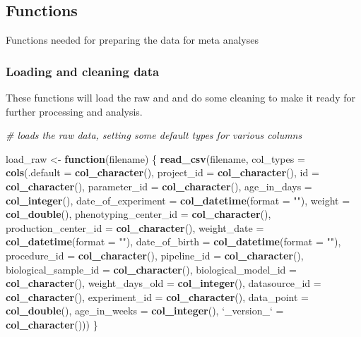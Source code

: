 \documentclass[]{article}
\newenvironment{Shaded}{\begin{snugshade}}{\end{snugshade}}
\newcommand{\CommentTok}[1]{\textcolor[rgb]{0.56,0.35,0.01}{\textit{#1}}}
\newcommand{\ControlFlowTok}[1]{\textcolor[rgb]{0.13,0.29,0.53}{\textbf{#1}}}
\newcommand{\DataTypeTok}[1]{\textcolor[rgb]{0.13,0.29,0.53}{#1}}
\newcommand{\KeywordTok}[1]{\textcolor[rgb]{0.13,0.29,0.53}{\textbf{#1}}}
\newcommand{\NormalTok}[1]{#1}
\newcommand{\StringTok}[1]{\textcolor[rgb]{0.31,0.60,0.02}{#1}}
\begin{document}
\hypertarget{functions}{%
\subsection{Functions}\label{functions}}

Functions needed for preparing the data for meta analyses

\hypertarget{loading-and-cleaning-data}{%
\subsubsection{Loading and cleaning
data}\label{loading-and-cleaning-data}}

These functions will load the raw and and do some cleaning to make it
ready for further processing and analysis.

\begin{Shaded}
\begin{Highlighting}[]
\CommentTok{# loads the raw data, setting some default types for various columns}

\NormalTok{load_raw <-}\StringTok{ }\ControlFlowTok{function}\NormalTok{(filename) \{}
    \KeywordTok{read_csv}\NormalTok{(filename, }\DataTypeTok{col_types =} \KeywordTok{cols}\NormalTok{(}\DataTypeTok{.default =} \KeywordTok{col_character}\NormalTok{(), }\DataTypeTok{project_id =} \KeywordTok{col_character}\NormalTok{(), }
        \DataTypeTok{id =} \KeywordTok{col_character}\NormalTok{(), }\DataTypeTok{parameter_id =} \KeywordTok{col_character}\NormalTok{(), }\DataTypeTok{age_in_days =} \KeywordTok{col_integer}\NormalTok{(), }
        \DataTypeTok{date_of_experiment =} \KeywordTok{col_datetime}\NormalTok{(}\DataTypeTok{format =} \StringTok{""}\NormalTok{), }\DataTypeTok{weight =} \KeywordTok{col_double}\NormalTok{(), }\DataTypeTok{phenotyping_center_id =} \KeywordTok{col_character}\NormalTok{(), }
        \DataTypeTok{production_center_id =} \KeywordTok{col_character}\NormalTok{(), }\DataTypeTok{weight_date =} \KeywordTok{col_datetime}\NormalTok{(}\DataTypeTok{format =} \StringTok{""}\NormalTok{), }
        \DataTypeTok{date_of_birth =} \KeywordTok{col_datetime}\NormalTok{(}\DataTypeTok{format =} \StringTok{""}\NormalTok{), }\DataTypeTok{procedure_id =} \KeywordTok{col_character}\NormalTok{(), }
        \DataTypeTok{pipeline_id =} \KeywordTok{col_character}\NormalTok{(), }\DataTypeTok{biological_sample_id =} \KeywordTok{col_character}\NormalTok{(), }\DataTypeTok{biological_model_id =} \KeywordTok{col_character}\NormalTok{(), }
        \DataTypeTok{weight_days_old =} \KeywordTok{col_integer}\NormalTok{(), }\DataTypeTok{datasource_id =} \KeywordTok{col_character}\NormalTok{(), }\DataTypeTok{experiment_id =} \KeywordTok{col_character}\NormalTok{(), }
        \DataTypeTok{data_point =} \KeywordTok{col_double}\NormalTok{(), }\DataTypeTok{age_in_weeks =} \KeywordTok{col_integer}\NormalTok{(), }\StringTok{`}\DataTypeTok{_version_}\StringTok{`}\NormalTok{ =}\StringTok{ }\KeywordTok{col_character}\NormalTok{()))}
\NormalTok{\}}


\end{Highlighting}
\end{Shaded}
\end{document}

